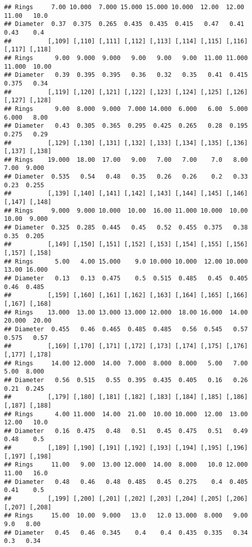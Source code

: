 \documentclass[
]{article}
\begin{document}
\begin{verbatim}
## Rings     7.00 10.000  7.000 15.000 15.000 10.000  12.00  12.00  11.00   10.0
## Diameter  0.37  0.375  0.265  0.435  0.435  0.415   0.47   0.41   0.43    0.4
##          [,109] [,110] [,111] [,112] [,113] [,114] [,115] [,116] [,117] [,118]
## Rings      9.00  9.000  9.000   9.00   9.00   9.00  11.00 11.000 11.000  10.00
## Diameter   0.39  0.395  0.395   0.36   0.32   0.35   0.41  0.415  0.375   0.34
##          [,119] [,120] [,121] [,122] [,123] [,124] [,125] [,126] [,127] [,128]
## Rings      9.00  8.000  9.000  7.000 14.000  6.000   6.00  5.000  6.000   8.00
## Diameter   0.43  0.305  0.365  0.295  0.425  0.265   0.28  0.195  0.275   0.29
##          [,129] [,130] [,131] [,132] [,133] [,134] [,135] [,136] [,137] [,138]
## Rings    19.000  18.00  17.00   9.00   7.00   7.00    7.0   8.00   7.00  9.000
## Diameter  0.535   0.54   0.48   0.35   0.26   0.26    0.2   0.33   0.23  0.255
##          [,139] [,140] [,141] [,142] [,143] [,144] [,145] [,146] [,147] [,148]
## Rings     9.000  9.000 10.000  10.00  16.00 11.000 10.000  10.00  10.00  9.000
## Diameter  0.325  0.285  0.445   0.45   0.52  0.455  0.375   0.38   0.35  0.205
##          [,149] [,150] [,151] [,152] [,153] [,154] [,155] [,156] [,157] [,158]
## Rings      5.00   4.00 15.000    9.0 10.000 10.000  12.00 10.000  13.00 16.000
## Diameter   0.13   0.13  0.475    0.5  0.515  0.485   0.45  0.405   0.46  0.485
##          [,159] [,160] [,161] [,162] [,163] [,164] [,165] [,166] [,167] [,168]
## Rings    13.000  13.00 13.000 13.000 12.000  18.00 16.000  14.00 20.000  20.00
## Diameter  0.455   0.46  0.465  0.485  0.485   0.56  0.545   0.57  0.575   0.57
##          [,169] [,170] [,171] [,172] [,173] [,174] [,175] [,176] [,177] [,178]
## Rings     14.00 12.000  14.00  7.000  8.000  8.000   5.00   7.00   5.00  8.000
## Diameter   0.56  0.515   0.55  0.395  0.435  0.405   0.16   0.26   0.21  0.245
##          [,179] [,180] [,181] [,182] [,183] [,184] [,185] [,186] [,187] [,188]
## Rings      4.00 11.000  14.00  21.00  10.00 10.000  12.00  13.00  12.00   10.0
## Diameter   0.16  0.475   0.48   0.51   0.45  0.475   0.51   0.49   0.48    0.5
##          [,189] [,190] [,191] [,192] [,193] [,194] [,195] [,196] [,197] [,198]
## Rings     11.00   9.00  13.00 12.000  14.00  8.000   10.0 12.000  11.00   16.0
## Diameter   0.48   0.46   0.48  0.485   0.45  0.275    0.4  0.405   0.41    0.5
##          [,199] [,200] [,201] [,202] [,203] [,204] [,205] [,206] [,207] [,208]
## Rings     15.00  10.00  9.000   13.0   12.0 13.000  8.000   9.00    9.0   8.00
## Diameter   0.45   0.46  0.345    0.4    0.4  0.435  0.335   0.34    0.3   0.34

\end{verbatim}
\end{document}
